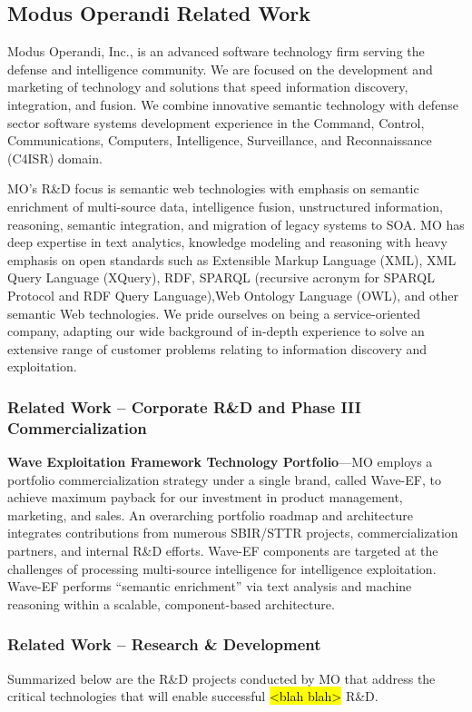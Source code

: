 \documentclass{sbir}
\begin{document}
\subsection{Modus Operandi Related Work}
Modus Operandi, Inc., is an advanced software technology firm serving the defense and intelligence community. We are focused on the development and marketing of technology and solutions that speed information discovery, integration, and fusion. We combine innovative semantic technology with defense sector software systems development experience in the Command, Control, Communications, Computers, Intelligence, Surveillance, and Reconnaissance (C4ISR) domain.

MO's R\&D focus is semantic web technologies with emphasis on semantic enrichment of multi-source data, intelligence fusion, unstructured information, reasoning, semantic integration, and migration of legacy systems to SOA. MO has deep expertise in text analytics, knowledge modeling and reasoning with heavy emphasis on open standards such as Extensible Markup Language (XML), XML Query Language (XQuery), RDF, SPARQL (recursive acronym for SPARQL Protocol and RDF Query Language),Web Ontology Language (OWL), and other semantic Web technologies. We pride ourselves on being a service-oriented company, adapting our wide background of in-depth experience to solve an extensive range of customer problems relating to information discovery and exploitation.

\subsubsection{Related Work -- Corporate R\&D and Phase III Commercialization}
{\bfseries Wave Exploitation Framework Technology Portfolio}---MO employs a portfolio commercialization strategy under a single brand, called Wave-EF, to achieve maximum payback for our investment in product management, marketing, and sales. An overarching portfolio roadmap and architecture integrates contributions from numerous SBIR/STTR projects, commercialization partners, and internal R\&D efforts. Wave-EF components are targeted at the challenges of processing multi-source intelligence for intelligence exploitation. Wave-EF performs ``semantic enrichment'' via text analysis and machine reasoning within a scalable, component-based architecture.

\subsubsection{Related Work -- Research \& Development}
Summarized below are the R\&D projects conducted by MO that address the critical technologies that will enable successful \hl{<blah blah>} R\&D.
\end{document}
